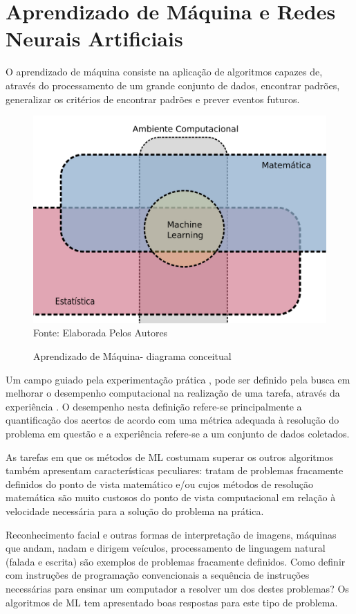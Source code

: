 \section{Aprendizado de Máquina e Redes Neurais Artificiais}
\label{sec:ml}

O aprendizado de máquina consiste na aplicação de algoritmos capazes de, através do processamento de um grande conjunto de dados, encontrar padrões, generalizar os critérios de encontrar padrões e prever eventos futuros\cite{bendavid2014}.

\begin{figure}[!htb]
	\centering
	\caption{Aprendizado de Máquina- diagrama conceitual}
	\includegraphics[width=.7\textwidth]{../Figures/ML/mat_est_ML.png}
	\\{\footnotesize Fonte: Elaborada Pelos Autores}
	\label{fig:MLdiag}
\end{figure}

Um campo guiado pela experimentação prática \cite{bishop2006}, pode ser definido pela busca em melhorar o desempenho computacional na realização de uma tarefa, através da experiência \cite{mitchell1997}. O desempenho nesta definição refere-se principalmente a quantificação dos acertos de acordo com uma métrica adequada à resolução do problema em questão e a experiência refere-se a um conjunto de dados coletados.

As tarefas em que os métodos de ML costumam superar os outros algoritmos também apresentam características peculiares: tratam de problemas fracamente definidos do ponto de vista matemático e/ou cujos métodos de resolução matemática são muito custosos do ponto de vista computacional em relação à velocidade necessária para a solução do problema na prática.

Reconhecimento facial e outras formas de interpretação de imagens, máquinas que andam, nadam e dirigem veículos, processamento de linguagem natural (falada e escrita) são exemplos de problemas fracamente definidos. Como definir com instruções de programação convencionais a sequência de instruções necessárias para ensinar um computador a resolver um dos destes problemas? Os algoritmos de ML tem apresentado boas respostas para este tipo de problema.

